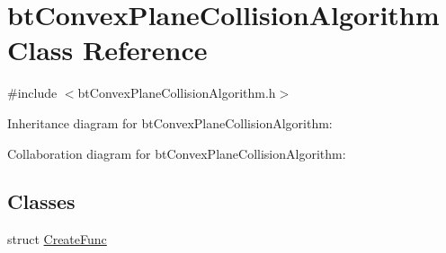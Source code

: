 \hypertarget{classbt_convex_plane_collision_algorithm}{\section{bt\+Convex\+Plane\+Collision\+Algorithm Class Reference}
\label{classbt_convex_plane_collision_algorithm}
}


{\ttfamily \#include $<$bt\+Convex\+Plane\+Collision\+Algorithm.\+h$>$}



Inheritance diagram for bt\+Convex\+Plane\+Collision\+Algorithm\+:


Collaboration diagram for bt\+Convex\+Plane\+Collision\+Algorithm\+:
\subsection*{Classes}
\begin{DoxyCompactItemize}
\item 
struct \hyperlink{structbt_convex_plane_collision_algorithm_1_1_create_func}{Create\+Func}
\end{DoxyCompactItemize}
